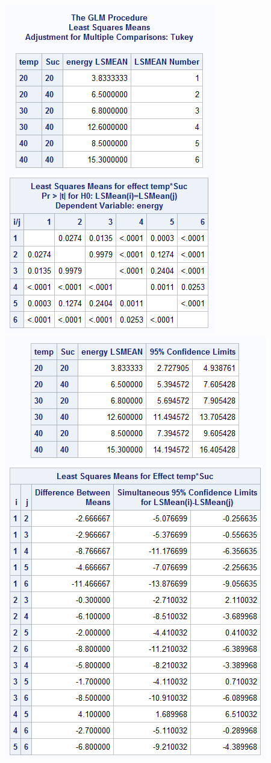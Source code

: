 \begin{center}
\includegraphics[scale=0.7]{EntDiffs}\includegraphics[scale=0.7]{EntDiffs2}
\end{center}

